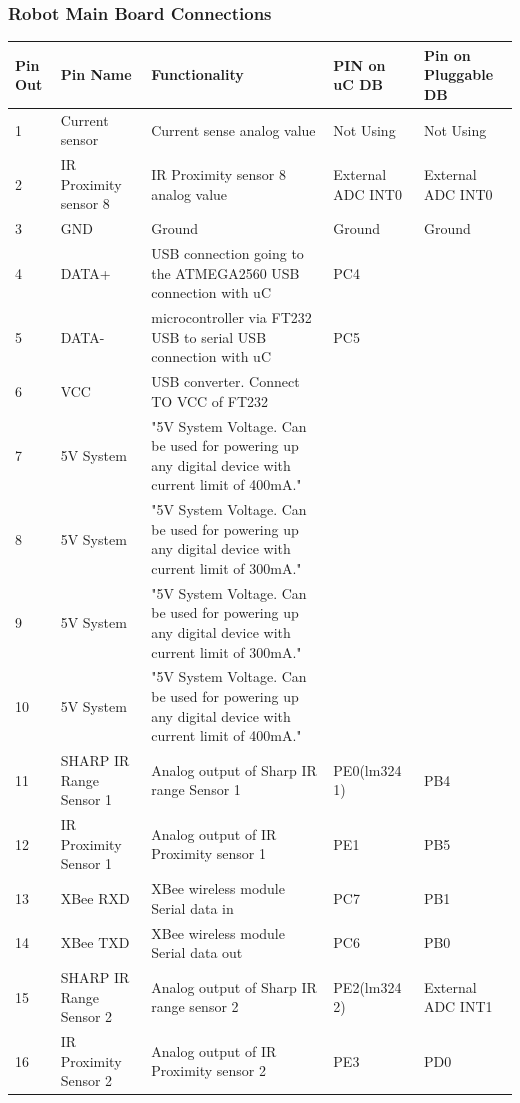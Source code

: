 \documentclass[a4paper,10pt,oneside]{article}
\begin{document}
{		\subsubsection{\textbf{Robot Main Board Connections}}
			\begin{longtable}{|p{}|p{}|p{}|p{.1\textwidth}|p{}|}\hline
				Pin Out&	Pin Name&	Functionality&	PIN on uC DB& Pin on Pluggable DB\\ \hline
				1&	Current sensor&	Current sense analog value&	Not Using & Not Using\\ \hline
				2&	IR Proximity sensor 8&	IR Proximity sensor 8 analog value&	External ADC INT0&	External ADC INT0\\ \hline
				3&	GND&	Ground	&Ground & Ground\\ \hline
				4&	DATA+&	USB connection going to the ATMEGA2560	USB connection with uC & PC4 & \\ \hline
				5&	DATA-&	microcontroller via FT232 USB to serial	USB connection with uC &PC5 & \\ \hline
				6&	VCC& USB	converter.	Connect TO VCC of FT232& &\\ \hline
				7&	5V System&	"5V System Voltage. Can be used for powering
				up any digital device with current limit of
				400mA."	& &\\ \hline
				8&	5V System&	"5V System Voltage. Can be used for powering
				up any digital device with current limit of
				300mA."	& &\\ \hline
				9&	5V System&	"5V System Voltage. Can be used for powering
				up any digital device with current limit of
				300mA."	& &\\ \hline
				10&	5V System&	"5V System Voltage. Can be used for powering
				up any digital device with current limit of
				400mA."	& &\\ \hline
				11&	SHARP IR Range Sensor 1	&Analog output of Sharp IR range Sensor 1&	PE0(lm324 1) & PB4\\ \hline
				12&	IR Proximity Sensor 1&	Analog output of IR Proximity sensor 1&	PE1 & PB5\\ \hline
				13&	XBee RXD&	XBee wireless module Serial data in	&PC7 & PB1\\ \hline
				14&	XBee TXD&	XBee wireless module Serial data out&	PC6 & PB0\\ \hline
				15&	SHARP IR Range Sensor 2	& Analog output of Sharp IR range sensor 2&	PE2(lm324 2) & External ADC INT1\\ \hline
				16&	IR Proximity Sensor 2&	Analog output of IR Proximity sensor 2&	PE3 & PD0\\ \hline

\end{longtable}}
\end{document}
